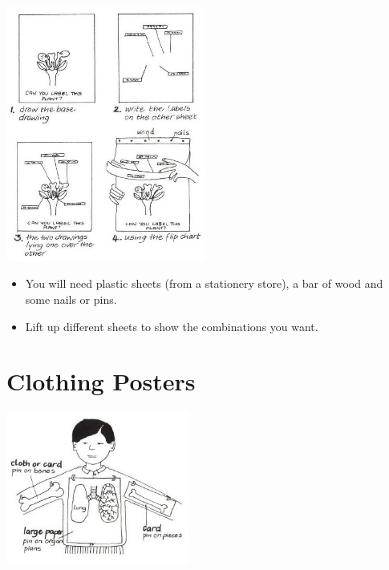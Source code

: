 \begin{multicols}{2}
\begin{center}
\includegraphics[width=0.49\textwidth]{./img/vso/transparent-display.jpg}
\end{center}

\begin{itemize}
\item You will need plastic sheets (from a stationery store), a bar of wood and some nails or pins.
\item Lift up different sheets to show the combinations you want.
\end{itemize}

\vfill
\columnbreak


\section{Clothing Posters}

\begin{center}
\includegraphics[width=0.45\textwidth]{./img/vso/clothing-poster.jpg}
\end{center}


\end{multicols}
